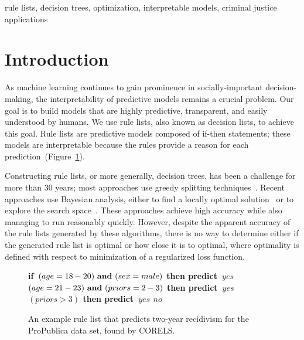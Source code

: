 \documentclass[twoside,11pt]{article}
\def\bif{\bf if~}
\def\belif{{\bf else if~}}
\def\bthen{{\bf then predict~}}
\def\belse{{\bf else predict~}}
\def \band{{\bf ~and~}}
\begin{document}
\begin{keywords}
    rule lists, decision trees, optimization, interpretable models, criminal justice applications
\end{keywords}

\section{Introduction}

As machine learning continues to gain prominence in socially-important decision-making,
the interpretability of predictive models remains a crucial problem.
%
Our goal is to build models that are highly predictive, transparent, and easily understood by humans.
%
We use rule lists, also known as decision lists, to achieve this goal.
%
Rule lists are predictive models composed of if-then statements;
these models are interpretable because the rules provide a reason for each prediction~(Figure~\ref{fig:rule-list}).

Constructing rule lists, or more generally, decision trees, has been a challenge for more than
30 years; most approaches use greedy splitting techniques~\citep{Rivest87,Breiman84,Quinlan93}.
%
Recent approaches use Bayesian analysis, either to find a locally optimal solution~\citep{Chipman:1998jh} or to explore the search space~\citep{LethamRuMcMa15, YangRuSe16}.
%
These approaches achieve high accuracy while also managing to run reasonably quickly.
%
However, despite the apparent accuracy of the rule lists generated by these algorithms,
there is no way to determine either if the generated rule list is optimal or how close it is to optimal,
where optimality is defined with respect to minimization of a regularized loss function.

\begin{arxiv}
\begin{figure}[t!]
\begin{algorithmic}
\State \bif $(age=18-20) \band (sex=male)$ \bthen $yes$
\State \belif $(age=21-23)	 \band (priors=2-3)$ \bthen $yes$
\State \belif $(priors>3)$ \bthen $yes$
\State \belse $no$
\end{algorithmic}
\caption{An example rule list that predicts two-year recidivism
for the ProPublica data set, found by CORELS.
}
\label{fig:rule-list}
\end{figure}
\end{arxiv}
\end{document}
